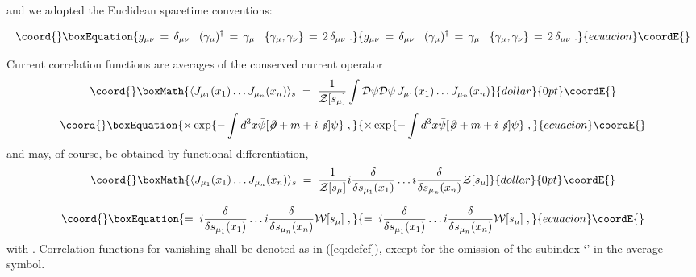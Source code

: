 \documentclass[a4paper,12pt]{article}
\begin{document}
and we adopted the Euclidean spacetime conventions:

\begin{equation}\coord{}\boxEquation{
  \label{eq:conv1}
  g_{\mu\nu}\,=\, \delta_{\mu\nu} \;\;\; (\gamma_\mu)^\dagger \,=\,
  \gamma_\mu \;\;\; \{ \gamma_\mu , \gamma_\nu \}\,=\, 2\,
  \delta_{\mu\nu} \;.
}{
  g_{\mu\nu}\,=\, \delta_{\mu\nu} \;\;\; (\gamma_\mu)^\dagger \,=\,
  \gamma_\mu \;\;\; \{ \gamma_\mu , \gamma_\nu \}\,=\, 2\,
  \delta_{\mu\nu} \;.
}{ecuacion}\coordE{}\end{equation}

Current correlation functions are averages of the conserved current
operator \coordHE{}  $$\coord{}\boxMath{
\langle J_{\mu_1} (x_1) \ldots J_{\mu_n} (x_n) \rangle_s \;=\; \frac{1}{{\mathcal
    Z}[s_\mu]} \int {\mathcal D}{\bar \psi} {\mathcal D}\psi \, J_{\mu_1} (x_1) \ldots
J_{\mu_n} (x_n)
}{dollar}{0pt}\coordE{}$$
\begin{equation}\coord{}\boxEquation{
 \label{eq:defcf}
\times \exp\{-\int d^3x {\bar\psi}[\not\!\partial + m + i \not \! s]
\psi\} \;,
}{
 \times \exp\{-\int d^3x {\bar\psi}[\not\!\partial + m + i \not \! s]
\psi\} \;,
}{ecuacion}\coordE{}\end{equation}
and may, of course, be obtained by functional differentiation,
$$\coord{}\boxMath{
\langle J_{\mu_1} (x_1) \ldots J_{\mu_n} (x_n) \rangle_s \;=\;
\frac{1}{{\mathcal Z}[s_\mu]}
i \frac{\delta}{\delta s_{\mu_1}(x_1)} \ldots i
\frac{\delta}{\delta s_{\mu_n}(x_n)}{\mathcal Z}[s_\mu]
}{dollar}{0pt}\coordE{}$$

\begin{equation}\coord{}\boxEquation{
  \label{eq:funcdif}
=\; i \frac{\delta}{\delta s_{\mu_1}(x_1)} \ldots i\frac{\delta}{\delta s_{\mu_n}(x_n)}
{\mathcal W}[s_\mu] \;,
}{
  =\; i \frac{\delta}{\delta s_{\mu_1}(x_1)} \ldots i\frac{\delta}{\delta s_{\mu_n}(x_n)}
{\mathcal W}[s_\mu] \;,
}{ecuacion}\coordE{}\end{equation}
with \coordHE{}. Correlation
functions for vanishing \coordHE{} shall be denoted as in (\ref{eq:defcf}),
except for the omission of the subindex `\coordHE{}' in the average symbol.
\end{document}
